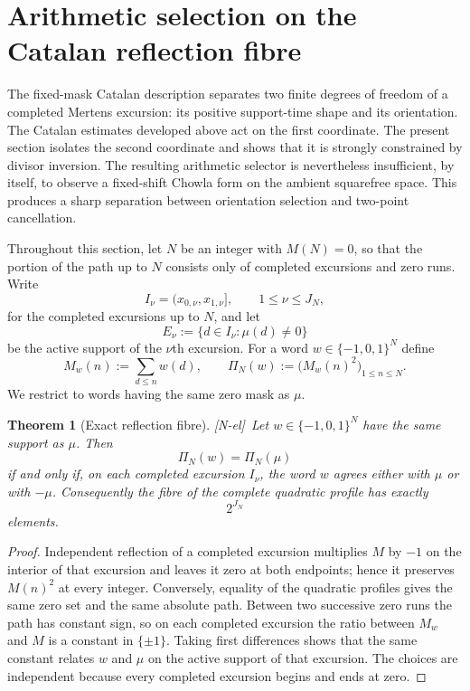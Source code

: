\documentclass[11pt]{amsart}
\numberwithin{equation}{section}
\theoremstyle{plain}
\newtheorem{theorem}{Theorem}[section]
\theoremstyle{definition}
\theoremstyle{remark}
\newcommand{\tagNE}{\textup{[N-el]}}
\begin{document}
\section{Arithmetic selection on the Catalan reflection fibre}
\label{sec:arithmetic-selection-fibre}

The fixed-mask Catalan description separates two finite degrees of freedom of a completed Mertens excursion: its positive support-time shape and its orientation.  The Catalan estimates developed above act on the first coordinate.  The present section isolates the second coordinate and shows that it is strongly constrained by divisor inversion.  The resulting arithmetic selector is nevertheless insufficient, by itself, to observe a fixed-shift Chowla form on the ambient squarefree space.  This produces a sharp separation between orientation selection and two-point cancellation.

Throughout this section, let $N$ be an integer with $M(N)=0$, so that the portion of the path up to $N$ consists only of completed excursions and zero runs.  Write
\[
I_\nu=(x_{0,\nu},x_{1,\nu}],\qquad 1\le \nu\le J_N,
\]
for the completed excursions up to $N$, and let
\[
E_\nu:=\{d\in I_\nu:\mu(d)\ne0\}
\]
be the active support of the $\nu$th excursion.  For a word $w\in\{-1,0,1\}^N$ define
\[
M_w(n):=\sum_{d\le n}w(d),\qquad
\Pi_N(w):=\bigl(M_w(n)^2\bigr)_{1\le n\le N}.
\]
We restrict to words having the same zero mask as $\mu$.

\begin{theorem}[Exact reflection fibre]
\label{thm:exact-reflection-fibre}
\tagNE\ Let $w\in\{-1,0,1\}^N$ have the same support as $\mu$.  Then
\[
\Pi_N(w)=\Pi_N(\mu)
\]
if and only if, on each completed excursion $I_\nu$, the word $w$ agrees either with $\mu$ or with $-\mu$.  Consequently the fibre of the complete quadratic profile has exactly
\[
2^{J_N}
\]
elements.
\end{theorem}

\begin{proof}
Independent reflection of a completed excursion multiplies $M$ by $-1$ on the interior of that excursion and leaves it zero at both endpoints; hence it preserves $M(n)^2$ at every integer.  Conversely, equality of the quadratic profiles gives the same zero set and the same absolute path.  Between two successive zero runs the path has constant sign, so on each completed excursion the ratio between $M_w$ and $M$ is a constant in $\{\pm1\}$.  Taking first differences shows that the same constant relates $w$ and $\mu$ on the active support of that excursion.  The choices are independent because every completed excursion begins and ends at zero.
\end{proof}
\end{document}
